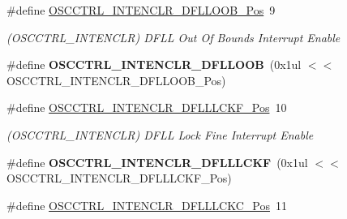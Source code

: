 \begin{DoxyCompactItemize}
\item 
\hypertarget{group___s_a_m_l21___o_s_c_c_t_r_l_ga42b59a19205fb09e83323b23751da9cc}{}\#define \hyperlink{group___s_a_m_l21___o_s_c_c_t_r_l_ga42b59a19205fb09e83323b23751da9cc}{O\+S\+C\+C\+T\+R\+L\+\_\+\+I\+N\+T\+E\+N\+C\+L\+R\+\_\+\+D\+F\+L\+L\+O\+O\+B\+\_\+\+Pos}~9\label{group___s_a_m_l21___o_s_c_c_t_r_l_ga42b59a19205fb09e83323b23751da9cc}

\begin{DoxyCompactList}\small\item\em (O\+S\+C\+C\+T\+R\+L\+\_\+\+I\+N\+T\+E\+N\+C\+L\+R) D\+F\+L\+L Out Of Bounds Interrupt Enable \end{DoxyCompactList}\item 
\hypertarget{group___s_a_m_l21___o_s_c_c_t_r_l_gae2485d43623daea016338fecb7cb6c32}{}\#define {\bfseries O\+S\+C\+C\+T\+R\+L\+\_\+\+I\+N\+T\+E\+N\+C\+L\+R\+\_\+\+D\+F\+L\+L\+O\+O\+B}~(0x1ul $<$$<$ O\+S\+C\+C\+T\+R\+L\+\_\+\+I\+N\+T\+E\+N\+C\+L\+R\+\_\+\+D\+F\+L\+L\+O\+O\+B\+\_\+\+Pos)\label{group___s_a_m_l21___o_s_c_c_t_r_l_gae2485d43623daea016338fecb7cb6c32}

\item 
\hypertarget{group___s_a_m_l21___o_s_c_c_t_r_l_gaedeada806272464f02c40c311aa13580}{}\#define \hyperlink{group___s_a_m_l21___o_s_c_c_t_r_l_gaedeada806272464f02c40c311aa13580}{O\+S\+C\+C\+T\+R\+L\+\_\+\+I\+N\+T\+E\+N\+C\+L\+R\+\_\+\+D\+F\+L\+L\+L\+C\+K\+F\+\_\+\+Pos}~10\label{group___s_a_m_l21___o_s_c_c_t_r_l_gaedeada806272464f02c40c311aa13580}

\begin{DoxyCompactList}\small\item\em (O\+S\+C\+C\+T\+R\+L\+\_\+\+I\+N\+T\+E\+N\+C\+L\+R) D\+F\+L\+L Lock Fine Interrupt Enable \end{DoxyCompactList}\item 
\hypertarget{group___s_a_m_l21___o_s_c_c_t_r_l_ga662fbe17d7e1cfa9a95018c6eb3a72c0}{}\#define {\bfseries O\+S\+C\+C\+T\+R\+L\+\_\+\+I\+N\+T\+E\+N\+C\+L\+R\+\_\+\+D\+F\+L\+L\+L\+C\+K\+F}~(0x1ul $<$$<$ O\+S\+C\+C\+T\+R\+L\+\_\+\+I\+N\+T\+E\+N\+C\+L\+R\+\_\+\+D\+F\+L\+L\+L\+C\+K\+F\+\_\+\+Pos)\label{group___s_a_m_l21___o_s_c_c_t_r_l_ga662fbe17d7e1cfa9a95018c6eb3a72c0}

\item 
\hypertarget{group___s_a_m_l21___o_s_c_c_t_r_l_gacfd407452687ecbe98f2092c48c9cf0b}{}\#define \hyperlink{group___s_a_m_l21___o_s_c_c_t_r_l_gacfd407452687ecbe98f2092c48c9cf0b}{O\+S\+C\+C\+T\+R\+L\+\_\+\+I\+N\+T\+E\+N\+C\+L\+R\+\_\+\+D\+F\+L\+L\+L\+C\+K\+C\+\_\+\+Pos}~11\label{group___s_a_m_l21___o_s_c_c_t_r_l_gacfd407452687ecbe98f2092c48c9cf0b}


\end{DoxyCompactItemize}
